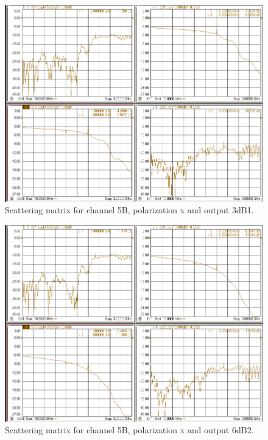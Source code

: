 \documentclass[12pt,a4paper,oneside]{article}
\begin{document}
\begin{figure}[H]
\centering
\includegraphics[width=0.9\linewidth]{VNA_results/5Bx_3dB1.png}
\caption{Scattering matrix for channel 5B, polarization x and output 3dB1.}
\label{fig:5Bx_3dB1}
\end{figure}


\begin{figure}[H]
\centering
\includegraphics[width=0.9\linewidth]{VNA_results/5Bx_6dB2.png}
\caption{Scattering matrix for channel 5B, polarization x and output 6dB2.}
\label{fig:5Bx_6dB2}
\end{figure}
\end{document}
